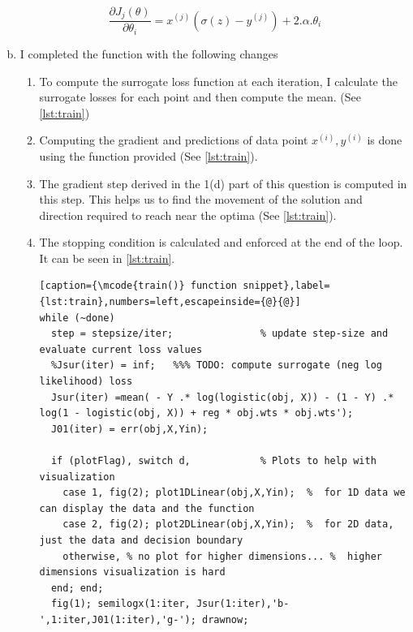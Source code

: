 \documentclass[a4paper, 11pt]{article}
\begin{document}
\begin{enumerate}[(a)]
\begin{equation}
\frac{\partial J_j(\theta)}{\partial \theta_i} = x^{(j)}  (\sigma(z)-y^{(j)}) + 2.\alpha.\theta_{i}
\label{eqn:grad1}
\end{equation}


\item I completed the  function with the following changes
\begin{enumerate}[1.]
\item To compute the surrogate loss function at each iteration, I calculate the surrogate losses for each point and then compute the mean. (See \autoref{lst:train})
\item Computing the gradient and predictions of data point \(x^{(i)}, y^{(i)}\) is done using the  function provided (See \autoref{lst:train}).
\item The gradient step derived in the 1(d) part of this question is computed in this step. This helps us to find the movement of the solution and direction required to reach near the optima (See \autoref{lst:train}).
\item The stopping condition is calculated and enforced at the end of the loop. It can be seen in \autoref{lst:train}.
\vspace{-25pt}
\begin{lstlisting}[caption={\mcode{train()} function snippet},label={lst:train},numbers=left,escapeinside={@}{@}]
while (~done) 
  step = stepsize/iter;               % update step-size and evaluate current loss values
  %Jsur(iter) = inf;   %%% TODO: compute surrogate (neg log likelihood) loss
  Jsur(iter) =mean( - Y .* log(logistic(obj, X)) - (1 - Y) .* log(1 - logistic(obj, X)) + reg * obj.wts * obj.wts');
  J01(iter) = err(obj,X,Yin);

  if (plotFlag), switch d,            % Plots to help with visualization
    case 1, fig(2); plot1DLinear(obj,X,Yin);  %  for 1D data we can display the data and the function
    case 2, fig(2); plot2DLinear(obj,X,Yin);  %  for 2D data, just the data and decision boundary
    otherwise, % no plot for higher dimensions... %  higher dimensions visualization is hard
  end; end;
  fig(1); semilogx(1:iter, Jsur(1:iter),'b-',1:iter,J01(1:iter),'g-'); drawnow;


\end{lstlisting}
\end{enumerate}
\end{enumerate}
\end{document}

